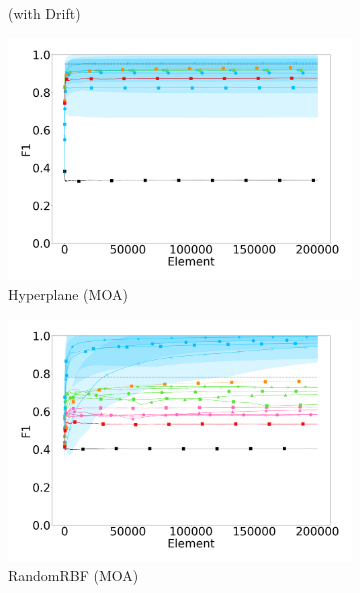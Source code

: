 \begin{figure}
\begin{subfigure}[t]{.49\linewidth}
		\caption{\banosdataset (with Drift)}
		\label{fig:f1-drift}
	\end{subfigure}
		\vskip 0.1cm
	\begin{subfigure}[t]{.49\linewidth}
		\includegraphics[width=\linewidth]{figures/results/dataset_1_f1_std.png}
		\caption{Hyperplane (MOA)}
		\label{fig:f1-dataset_1}
	\end{subfigure}
	\begin{subfigure}[t]{.49\linewidth}
		\includegraphics[width=\linewidth]{figures/results/dataset_2_f1_std.png}
		\caption{RandomRBF (MOA)}
		\label{fig:f1-dataset_2}
	\end{subfigure}
		\vskip 0.1cm
	\begin{subfigure}[t]{.49\linewidth}

\end{subfigure}
\end{figure}
